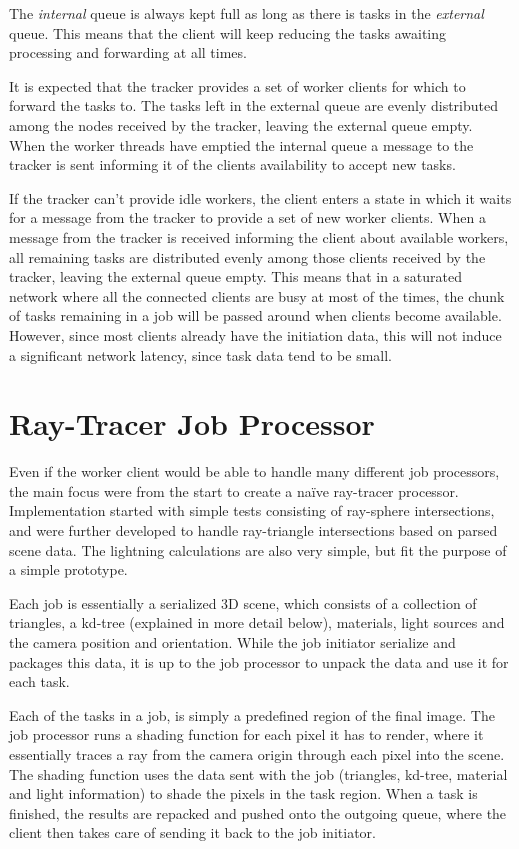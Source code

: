 The \textit{internal} queue is always kept full as long as there is tasks in the
\textit{external} queue. This means that the client will keep reducing the tasks
awaiting processing and forwarding at all times.

It is expected that the tracker provides a set of worker clients for which to
forward the tasks to. The tasks left in the external queue are evenly
distributed among the nodes received by the tracker, leaving the external queue
empty. When the worker threads have emptied the internal queue a message to the
tracker is sent informing it of the clients availability to accept new tasks.

If the tracker can't provide idle workers, the client enters a state in which it
waits for a message from the tracker to provide a set of new worker clients. When a
message from the tracker is received informing the client about available workers,
all remaining tasks are distributed evenly among those clients received by the 
tracker, leaving the external queue empty. This means that in a saturated
network where all the connected clients are busy at most of the times, the
chunk of tasks remaining in a job will be passed around when clients become
available. However, since most clients already have the initiation data, this
will not induce a significant network latency, since task data tend to be small.


\section{Ray-Tracer Job Processor}
Even if the worker client would be able to handle many different job processors, the main focus were from the start to create a naïve ray-tracer processor. Implementation started with simple tests consisting of ray-sphere intersections, and were further developed to handle ray-triangle intersections based on parsed scene data. The lightning calculations are also very simple, but fit the purpose of a simple prototype.

Each job is essentially a serialized 3D scene, which consists of a collection of triangles, a kd-tree (explained in more detail below), materials, light sources and the camera position and orientation. While the job initiator serialize and packages this data, it is up to the job processor to unpack the data and use it for each task.

Each of the tasks in a job, is simply a predefined region of the final image. The job processor runs a shading function for each pixel it has to render, where it essentially traces a ray from the camera origin through each pixel into the scene. The shading function uses the data sent with the job (triangles, kd-tree, material and light information) to shade the pixels in the task region. When a task is finished, the results are repacked and pushed onto the outgoing queue, where the client then takes care of sending it back to the job initiator.


